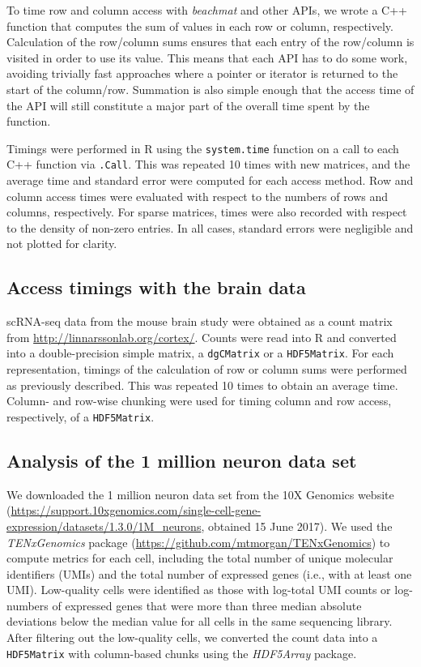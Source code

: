 \documentclass[10pt,letterpaper]{article}
\newcommand{\beachmat}{\textit{beachmat}}
\newcommand{\code}[1]{\texttt{#1}}
\begin{document}
To time row and column access with \beachmat{} and other APIs, we wrote a C++ function that computes the sum of values in each row or column, respectively.
Calculation of the row/column sums ensures that each entry of the row/column is visited in order to use its value.
This means that each API has to do some work, avoiding trivially fast approaches where a pointer or iterator is returned to the start of the column/row.
Summation is also simple enough that the access time of the API will still constitute a major part of the overall time spent by the function.

Timings were performed in R using the \code{system.time} function on a call to each C++ function via \code{.Call}. 
This was repeated 10 times with new matrices, and the average time and standard error were computed for each access method. 
Row and column access times were evaluated with respect to the numbers of rows and columns, respectively.
For sparse matrices, times were also recorded with respect to the density of non-zero entries.
In all cases, standard errors were negligible and not plotted for clarity.

\subsection*{Access timings with the brain data}
scRNA-seq data from the mouse brain study \cite{zeisel2015brain} were obtained as a count matrix from \url{http://linnarssonlab.org/cortex/}.
Counts were read into R and converted into a double-precision simple matrix, a \code{dgCMatrix} or a \code{HDF5Matrix}.
For each representation, timings of the calculation of row or column sums were performed as previously described.
This was repeated 10 times to obtain an average time.
Column- and row-wise chunking were used for timing column and row access, respectively, of a \code{HDF5Matrix}.

\subsection*{Analysis of the 1 million neuron data set}
We downloaded the 1 million neuron data set from the 10X Genomics website (\url{https://support.10xgenomics.com/single-cell-gene-expression/datasets/1.3.0/1M_neurons}, obtained 15 June 2017).
We used the \textit{TENxGenomics} package (\url{https://github.com/mtmorgan/TENxGenomics}) to compute metrics for each cell, including the total number of unique molecular identifiers (UMIs) and the total number of expressed genes (i.e., with at least one UMI).
Low-quality cells were identified as those with log-total UMI counts or log-numbers of expressed genes that were more than three median absolute deviations below the median value for all cells in the same sequencing library.
After filtering out the low-quality cells, we converted the count data into a \code{HDF5Matrix} with column-based chunks using the \textit{HDF5Array} package.
\end{document}
